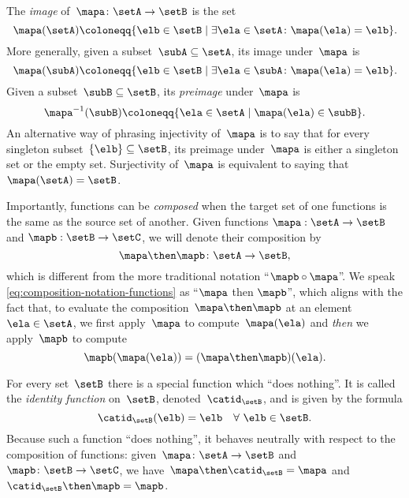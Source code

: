 The \emph{image} of~$\mapa\colon \setA \to \setB$ is the set
\begin{equation}
\mapa(\setA) \coloneqq \{ \elb \in \setB \mid \exists \ela \in \setA \colon \mapa(\ela) = \elb \}.
\end{equation}
More generally, given a subset~$\subA \subseteq \setA$, its image under~$\mapa$ is
\begin{equation*}
\mapa(\subA) \coloneqq \{ \elb \in \setB \mid \exists \ela \in \subA \colon \mapa(\ela) = \elb \}.
\end{equation*}
Given a subset~$\subB \subseteq \setB$, its \emph{preimage} under~$\mapa$ is
\begin{equation*}
\mapa^{-1}(\subB) \coloneqq \{ \ela \in \setA \mid  \mapa(\ela) \in \subB \}.
\end{equation*}
An alternative way of phrasing injectivity of~$\mapa$ is to say that for every singleton subset~$\{ \elb \} \subseteq \setB$, its preimage under~$\mapa$ is either a singleton set or the empty set.
Surjectivity of~$\mapa$ is equivalent to saying that~$\mapa(\setA) = \setB$.

Importantly, functions can be \emph{composed} when the target set of one functions is the same as the source set of another. Given functions $\mapa: \setA \to \setB$ and $\mapb : \setB \to \setC$, we will denote their composition by
\begin{equation}\label{eq:composition-notation-functions}
\mapa \then \mapb \colon \setA \to \setB,
\end{equation}
which is different from the more traditional notation ``$\mapb \circ \mapa$''.
We speak \cref{eq:composition-notation-functions} as ``$\mapa$ then $\mapb$'', which aligns with the fact that, to evaluate the composition~$\mapa \then \mapb$ at an element~$\ela \in \setA$, we first apply~$\mapa$ to compute~$\mapa(\ela)$ and \emph{then} we apply~$\mapb$ to compute
\begin{equation*}
\mapb(\mapa(\ela))=(\mapa \then \mapb)(\ela).
\end{equation*}

For every set~$\setB$ there is a special function which ``does nothing''.
It is called the \emph{identity function} on~$\setB$, denoted~$\catid_\setB$, and is given by the formula
\begin{equation*}
\catid_\setB(\elb) = \elb \quad \forall \ \elb \in \setB.
\end{equation*}
Because such a function ``does nothing'', it behaves neutrally with respect to the composition of functions:
given~$\mapa \colon \setA \to \setB$ and~$\mapb \colon \setB \to \setC$, we have~$\mapa \then \catid_\setB = \mapa$ and~$\catid_\setB \then \mapb = \mapb$.

